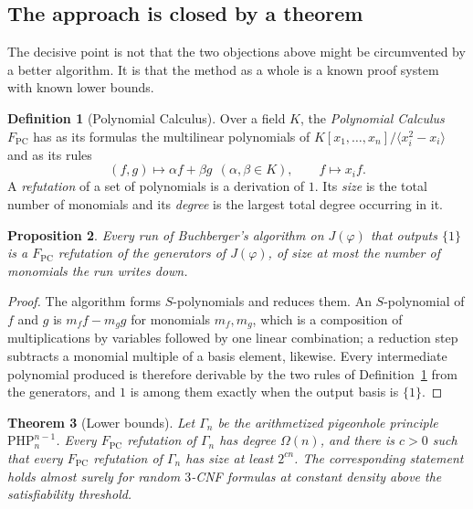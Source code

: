 \documentclass[11pt]{article}
\theoremstyle{plain}
\newtheorem{theorem}{Theorem}[section]
\newtheorem{proposition}[theorem]{Proposition}
\theoremstyle{definition}
\newtheorem{definition}[theorem]{Definition}
\theoremstyle{remark}
\newcommand{\PC}{F_{\mathrm{PC}}}
\begin{document}
\subsection{The approach is closed by a theorem}

The decisive point is not that the two objections above might be circumvented
by a better algorithm. It is that the method as a whole is a known proof system
with known lower bounds.

\begin{definition}[Polynomial Calculus]\label{def:pc}
Over a field $K$, the \emph{Polynomial Calculus} $\PC$ has as its formulas the
multilinear polynomials of $K[x_{1},\dots,x_{n}]/\langle x_{i}^{2}-x_{i}\rangle$
and as its rules
\[
(f,g)\longmapsto \alpha f+\beta g\ \ (\alpha,\beta\in K),
\qquad
f\longmapsto x_{i}f .
\]
A \emph{refutation} of a set of polynomials is a derivation of $1$. Its
\emph{size} is the total number of monomials and its \emph{degree} is the
largest total degree occurring in it.
\end{definition}

\begin{proposition}\label{prop:gbispc}
Every run of Buchberger's algorithm on $J(\varphi)$ that outputs $\{1\}$ is a
$\PC$ refutation of the generators of $J(\varphi)$, of size at most the number
of monomials the run writes down.
\end{proposition}

\begin{proof}
The algorithm forms $S$-polynomials and reduces them. An $S$-polynomial of $f$
and $g$ is $m_{f}f-m_{g}g$ for monomials $m_{f},m_{g}$, which is a composition
of multiplications by variables followed by one linear combination; a reduction
step subtracts a monomial multiple of a basis element, likewise. Every
intermediate polynomial produced is therefore derivable by the two rules of
Definition~\ref{def:pc} from the generators, and $1$ is among them exactly when
the output basis is $\{1\}$.
\end{proof}

\begin{theorem}[Lower bounds]\label{thm:lower}
Let $\Gamma_{n}$ be the arithmetized pigeonhole principle
$\mathrm{PHP}_{n}^{n-1}$. Every $\PC$ refutation of $\Gamma_{n}$ has degree
$\Omega(n)$, and there is $c>0$ such that every $\PC$ refutation of
$\Gamma_{n}$ has size at least $2^{cn}$. The corresponding statement holds
almost surely for random $3$-CNF formulas at constant density above the
satisfiability threshold.
\end{theorem}
\end{document}
